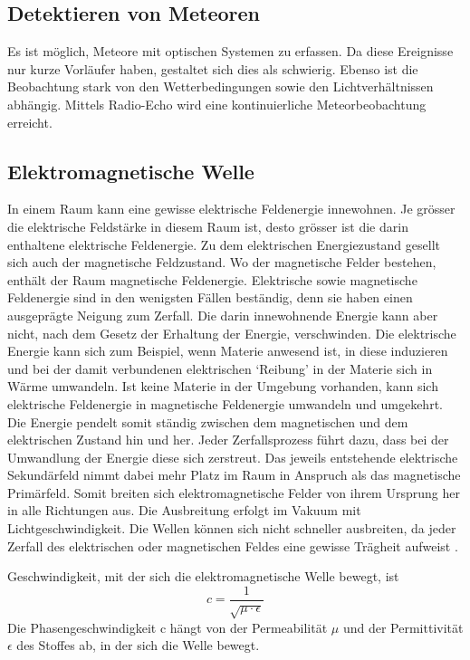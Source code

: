 \begin{refsection}
\section{Detektieren von Meteoren}

Es ist möglich, Meteore mit optischen Systemen zu erfassen. 
Da diese Ereignisse nur kurze Vorläufer haben, gestaltet sich dies als schwierig.
Ebenso ist die Beobachtung stark von den Wetterbedingungen sowie den Lichtverhältnissen abhängig.
Mittels Radio-Echo wird eine kontinuierliche Meteorbeobachtung erreicht. 

\subsection{Elektromagnetische Welle}
In einem Raum kann eine gewisse elektrische Feldenergie innewohnen.
Je grösser die elektrische Feldstärke in diesem Raum ist, desto grösser ist die darin enthaltene elektrische Feldenergie.
Zu dem elektrischen Energiezustand gesellt sich auch der magnetische Feldzustand.
Wo der magnetische Felder bestehen, enthält der Raum magnetische Feldenergie.
Elektrische sowie magnetische Feldenergie sind in den wenigsten Fällen beständig, denn sie haben einen ausgeprägte Neigung zum Zerfall.
Die darin innewohnende Energie kann aber nicht, nach dem Gesetz der Erhaltung der Energie, verschwinden.
Die elektrische Energie kann sich zum Beispiel, wenn Materie anwesend ist, in diese induzieren und bei der damit verbundenen elektrischen `Reibung' in der Materie sich in Wärme umwandeln.
Ist keine Materie in der Umgebung vorhanden, kann sich elektrische Feldenergie in magnetische Feldenergie umwandeln und umgekehrt. 
Die Energie pendelt somit ständig zwischen dem magnetischen und dem elektrischen Zustand hin und her.
Jeder Zerfallsprozess führt dazu, dass bei der Umwandlung der Energie diese sich zerstreut.
Das jeweils entstehende elektrische Sekundärfeld nimmt dabei mehr Platz im Raum in Anspruch als das magnetische Primärfeld.
Somit breiten sich elektromagnetische Felder von ihrem Ursprung her in alle Richtungen aus.
Die Ausbreitung erfolgt im Vakuum mit Lichtgeschwindigkeit.
Die Wellen können sich nicht schneller ausbreiten, da jeder Zerfall des elektrischen oder magnetischen Feldes eine gewisse Trägheit aufweist \cite{buch:meinke}.

Geschwindigkeit, mit der sich die elektromagnetische Welle bewegt, ist
\[
c
=
\frac{1}{\sqrt{\mu\cdot\epsilon}}
\]
Die Phasengeschwindigkeit c hängt von der Permeabilität $\mu$ und der Permittivität $\epsilon$ des Stoffes ab, in der sich die Welle bewegt.


\end{refsection}
